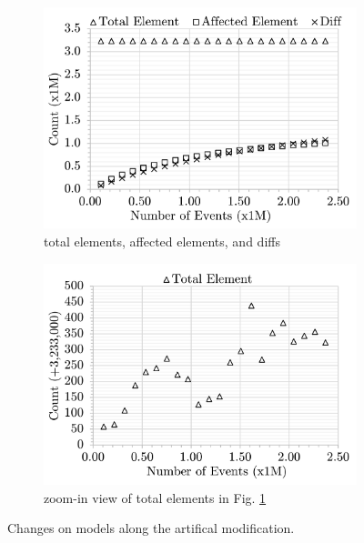 \documentclass{llncs}
\begin{document}
\begin{figure}[ht]
    \centering
    \begin{subfigure}[t]{0.495\linewidth}
        \includegraphics[width=\linewidth]{images/ModificationCourse}
        \caption{total elements, affected elements, and diffs}
        \label{fig:modification_course}
    \end{subfigure}
    \hfill
    \begin{subfigure}[t]{0.495\linewidth}
        \includegraphics[width=\linewidth]{images/ModelSize}
        \caption{zoom-in view of total elements in Fig. \ref{fig:modification_course}}
        \label{fig:model_size}
    \end{subfigure}
    \caption{Changes on models along the artifical modification.}
    \label{fig:modification_model_size}
\end{figure}
\end{document}
